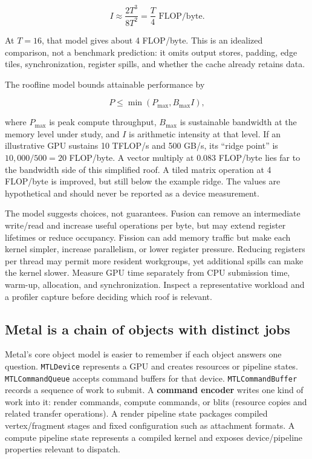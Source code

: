 \[
I\approx\frac{2T^3}{8T^2}=\frac{T}{4}\text{ FLOP/byte}.
\]

At \(T=16\), that model gives about 4 FLOP/byte. This is an idealized comparison, not a benchmark prediction: it omits output stores, padding, edge tiles, synchronization, register spills, and whether the cache already retains data.

The roofline model bounds attainable performance by

\[
P\le \min(P_{\max}, B_{\max} I),
\]

where \(P_{\max}\) is peak compute throughput, \(B_{\max}\) is sustainable bandwidth at the memory level under study, and \(I\) is arithmetic intensity at that level. If an illustrative GPU sustains 10 TFLOP/s and 500 GB/s, its ``ridge point'' is \(10{,}000/500=20\) FLOP/byte. A vector multiply at 0.083 FLOP/byte lies far to the bandwidth side of this simplified roof. A tiled matrix operation at 4 FLOP/byte is improved, but still below the example ridge. The values are hypothetical and should never be reported as a device measurement.

The model suggests choices, not guarantees. Fusion can remove an intermediate write/read and increase useful operations per byte, but may extend register lifetimes or reduce occupancy. Fission can add memory traffic but make each kernel simpler, increase parallelism, or lower register pressure. Reducing registers per thread may permit more resident workgroups, yet additional spills can make the kernel slower. Measure GPU time separately from CPU submission time, warm-up, allocation, and synchronization. Inspect a representative workload and a profiler capture before deciding which roof is relevant.

\subsection{Metal is a chain of objects with distinct jobs}\label{metal-is-a-chain-of-objects-with-distinct-jobs}

Metal's core object model is easier to remember if each object answers one question. \texttt{MTLDevice} represents a GPU and creates resources or pipeline states. \texttt{MTLCommandQueue} accepts command buffers for that device. \texttt{MTLCommandBuffer} records a sequence of work to submit. A \textbf{command encoder} writes one kind of work into it: render commands, compute commands, or blits (resource copies and related transfer operations). A render pipeline state packages compiled vertex/fragment stages and fixed configuration such as attachment formats. A compute pipeline state represents a compiled kernel and exposes device/pipeline properties relevant to dispatch.

